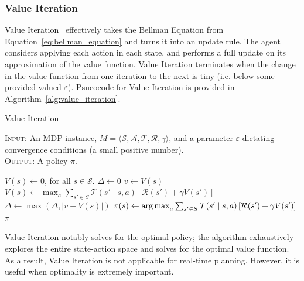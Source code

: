 \documentclass[11pt]{article}
\begin{document}

\subsubsection{Value Iteration}


Value Iteration~\cite{bellman57} effectively takes the Bellman Equation from Equation~\ref{eq:bellman_equation} and turns it into an update rule. The agent considers applying each action in each state, and performs a full update on its approximation of the value function. Value Iteration terminates when the change in the value function from one iteration to the next is tiny (i.e. below some provided valued $\varepsilon$). Psueocode for Value Iteration is provided in Algorithm~\ref{alg:value_iteration}.

\begin{algorithm}
\caption{Value Iteration}\label{alg:value_iteration}
\textsc{Input:} An MDP instance, $M = \langle \mathcal{S}, \mathcal{A}, \mathcal{T}, \mathcal{R}, \gamma \rangle$, and a parameter $\varepsilon$ dictating convergence conditions (a small positive number). \\
\textsc{Output:} A policy $\pi$.
\begin{algorithmic}[1]
\State $V(s) \gets 0$, for all $s \in \mathcal{S}$.
\State $\Delta \gets 0$
\While{$\Delta > \varepsilon$}
\State $v \gets V(s)$
\State $V(s) \gets \max_a \sum_{s' \in S} \mathcal{T}(s' \mid s, a) \left[\mathcal{R}(s') + \gamma V(s') \right]$
\State $\Delta \gets \max(\Delta, |v - V(s)|)$
\EndFor
\EndWhile
{}
\State $\pi(s) \gets \operatorname*{arg\,max}_a \sum_{s' \in S} \mathcal{T}(s' \mid s, a) \left[\mathcal{R}(s') + \gamma V(s') \right]$
\EndFor
{} $\pi$
\end{algorithmic}
\end{algorithm}

Value Iteration notably solves for the optimal policy; the algorithm exhaustively explores the entire state-action space and solves for the optimal value function. As a result, Value Iteration is not applicable for real-time planning. However, it is useful when optimality is extremely important.
\end{document}
